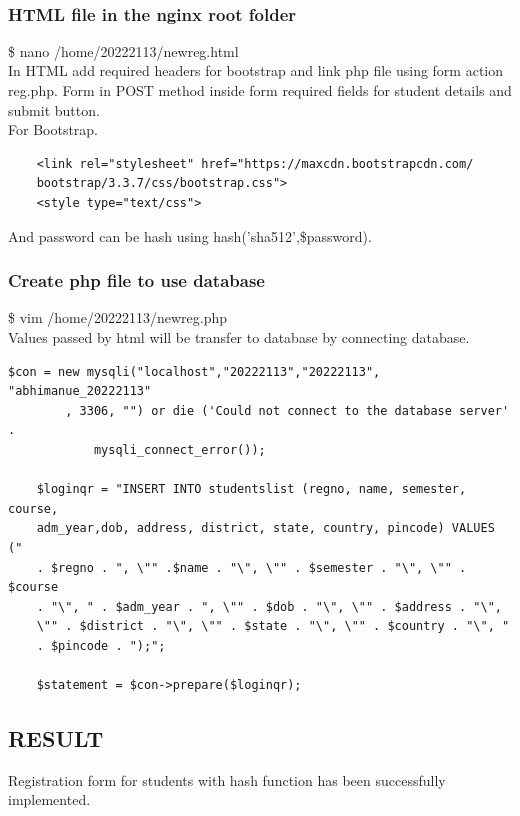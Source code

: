 \documentclass{article}
\begin{document}
\newpage
{}
\begin{verbatim}
    
\end{verbatim}
\newpage
\begin{flushleft}
\vspace{0.1in}
\subsubsection{HTML file in the nginx root folder}
\vspace{0.1in}
\$ nano /home/20222113/newreg.html \\
In HTML add required headers for bootstrap and link php file using form action reg.php.
Form in POST method inside form required fields for student details and submit button.\\
For Bootstrap.
\begin{verbatim}
    <link rel="stylesheet" href="https://maxcdn.bootstrapcdn.com/
    bootstrap/3.3.7/css/bootstrap.css">
    <style type="text/css">
\end{verbatim}
And password can be hash using  hash('sha512',\$password).\\

\subsubsection{Create php file to use database}
\$ vim /home/20222113/newreg.php\\
Values passed by html will be transfer to database by connecting database.\\
\vspace{0.2in}\begin{verbatim}$con = new mysqli("localhost","20222113","20222113", "abhimanue_20222113"
        , 3306, "") or die ('Could not connect to the database server' . 
            mysqli_connect_error());

    $loginqr = "INSERT INTO studentslist (regno, name, semester, course,
    adm_year,dob, address, district, state, country, pincode) VALUES ("
    . $regno . ", \"" .$name . "\", \"" . $semester . "\", \"" . $course
    . "\", " . $adm_year . ", \"" . $dob . "\", \"" . $address . "\",
    \"" . $district . "\", \"" . $state . "\", \"" . $country . "\", "
    . $pincode . ");";
    
    $statement = $con->prepare($loginqr);
\end{verbatim}
\vspace{1in}
\subsection{RESULT}
Registration form for students with hash function has been successfully implemented.

\end{flushleft}
\end{document}
